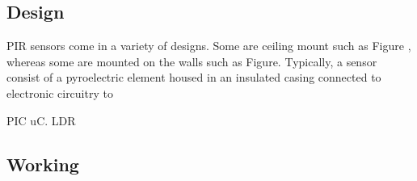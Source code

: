 





\subsection{Design} PIR sensors come in a variety of designs. Some are ceiling mount such as Figure , whereas some are mounted on the walls such as Figure. Typically, a sensor consist of a pyroelectric element housed in an insulated casing connected to electronic circuitry to  

PIC uC.
LDR


\subsection{Working} 

